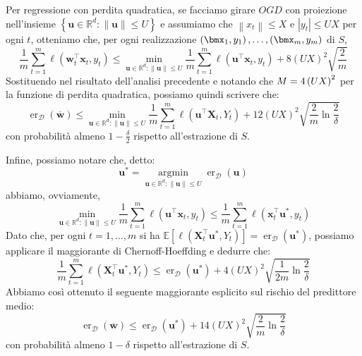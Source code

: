 \documentclass[\main/main.tex]{subfiles}
\begin{document}
\begin{analysis}
    Per regressione con perdita quadratica, se facciamo girare \(OGD\) con proiezione nell'insieme \(\left\{\boldsymbol{u} \in \mathbb{R}^{d} :\|\boldsymbol{u}\| \leq U\right\}\) e assumiamo che \(\left\|x_{t}\right\| \leq X\) e \(\left|y_{t}\right| \leq U X\) per ogni \(t\), otteniamo che, per ogni realizzazione \(\examples{m}\) di \(S\),
    \[\frac{1}{m} \sum_{t=1}^{m} \ell\left(\boldsymbol{w}_{t}^{\top} \boldsymbol{x}_{t}, y_{t}\right) \leq \min _{\boldsymbol{u} \in \mathbb{R}^{d} :\|\boldsymbol{u}\| \leq U} \frac{1}{m} \sum_{t=1}^{m} \ell\left(\boldsymbol{u}^{\top} \boldsymbol{x}_{t}, y_{t}\right)+8(U X)^{2} \sqrt{\frac{2}{m}}\]
    Sostituendo nel risultato dell'analisi precedente e notando che \(M=4\left(UX\right)^2\) per la funzione di perdita quadratica, possiamo quindi scrivere che:
    \[\operatorname{er}_{\mathcal{D}}(\overline{\boldsymbol{w}}) \leq \min _{\boldsymbol{u} \in \mathbb{R}^{d} :\|\boldsymbol{u}\| \leq U} \frac{1}{m} \sum_{t=1}^{m} \ell\left(\boldsymbol{u}^{\top} \boldsymbol{X}_{t}, Y_{t}\right)+12(U X)^{2} \sqrt{\frac{2}{m} \ln \frac{2}{\delta}}\]
    con probabilità almeno \(1-\frac{\delta}{2}\) rispetto all'estrazione di \(S\).
    
    Infine, possiamo notare che, detto:
    \[\boldsymbol{u}^{*}=\underset{\boldsymbol{u} \in \mathbb{R}^{d} :\|\boldsymbol{u}\| \leq U}{\operatorname{argmin}} \operatorname{er}_{\mathcal{D}}(\boldsymbol{u})\]
    abbiamo, ovviamente,
    \[
        \min _{\boldsymbol{u} \in \mathbb{R}^{d} :\|\boldsymbol{u}\| \leq U} \frac{1}{m} \sum_{t=1}^{m} \ell\left(\boldsymbol{u}^{\top} \boldsymbol{x}_{t}, y_{t}\right) \leq \frac{1}{m} \sum_{t=1}^{m} \ell\left(\boldsymbol{x}_{t}^{\top} \boldsymbol{u}^{*}, y_{t}\right)
    \]
    Dato che, per ogni \(t=1,\ldots,m\) si ha \(\mathbb{E}\left[\ell\left(\boldsymbol{X}_{t}^{\top} \boldsymbol{u}^{*}, Y_{t}\right)\right]=\operatorname{er}_{\mathcal{D}}\left(\boldsymbol{u}^{*}\right)\), possiamo applicare il maggiorante di Chernoff-Hoeffding e dedurre che:
    \[\frac{1}{m} \sum_{t=1}^{m} \ell\left(\boldsymbol{X}_{t}^{\top} \boldsymbol{u}^{*}, Y_{t}\right) \leq \operatorname{er}_{\mathcal{D}}\left(\boldsymbol{u}^{*}\right)+4(U X)^{2} \sqrt{\frac{1}{2 m} \ln \frac{2}{\delta}}\]
    Abbiamo così ottenuto il seguente maggiorante esplicito sul rischio del predittore medio:
    \[
        \operatorname{er}_{\mathcal{D}}(\overline{\boldsymbol{w}}) \leq \operatorname{er}_{\mathcal{D}}\left(\boldsymbol{u}^{*}\right)+14(U X)^{2} \sqrt{\frac{2}{m} \ln \frac{2}{\delta}}
    \]
    con probabilità almeno \(1-\delta\) rispetto all'estrazione di \(S\).
\end{analysis}
\end{document}
